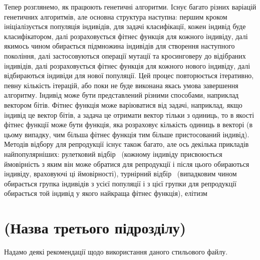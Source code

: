 Тепер розглянемо, як працюють генетичні алгоритми. Існує багато різних варіацій генетичних алгоритмів, але основна структура наступна: першим кроком ініціалізується популяція індивідів, для задачі класифікації, кожен індивід буде класифікатором, далі розраховується фітнес функція для кожного індивіду, далі якимось чином обирається підмножина індивідів для створення наступного покоління, далі застосовуються операції мутації та кросинговеру до відібраних індивідів, далі розраховується фітнес функція для кожного нового індивіду, далі відбираються індивіди для нової популяції. Цей процес повторюється ітеративно, певну кількість ітерацій, або поки не буде виконана якась умова завершення алгоритму. Індивід може бути представлений різними способами, наприклад вектором бітів. Фітнес функція може варіюватися від задачі, наприклад, якщо індивід це вектор бітів, а задача це отримати вектор тільки з одиниць, то в якості фітнес функції може бути функція, яка розраховує кількість одиниць в векторі (в цьому випадку, чим більша фітнес функція тим більше пристосований індивід). Методів відбору для репродукції існує також багато, але ось декілька прикладів найпопулярніших: рулетковий відбір~\cite{ct2} (кожному індивіду присвоюється ймовірність з яким він може обратися для репродукції і після цього обираються індивіду, враховуючі ці ймовірності), турнірний відбір~\cite{ct3} (випадковим чином обирається групка індивідів з усієї популяції і з цієї групки для репродукції обирається той індивід у якого найкраща фітнес функція), елітизм

\section{(Назва третього підрозділу)}


Надамо деякі рекомендації щодо використання даного стильового файлу.

